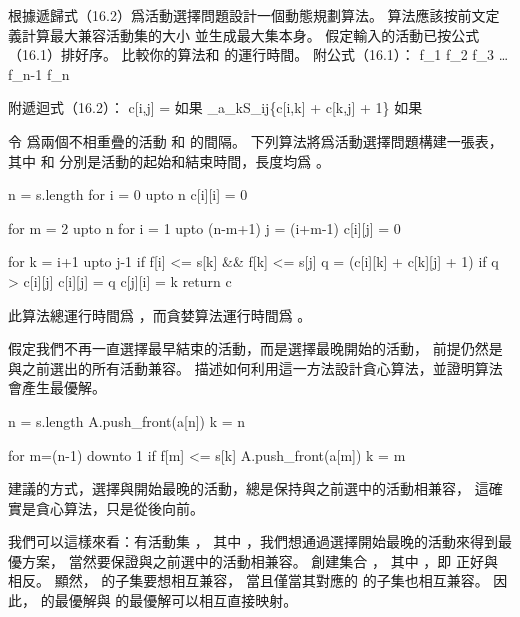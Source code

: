 \startsection[
  title={An activity-selection problem},
]

\startEXERCISE
根據遞歸式（16.2）爲活動選擇問題設計一個動態規劃算法。
算法應該按前文定義計算最大兼容活動集的大小  並生成最大集本身。
假定輸入的活動已按公式（16.1）排好序。
比較你的算法和  的運行時間。
附公式（16.1）：
\startformula
f_1 \le f_2 \le f_3 \le \ldots \le f_{n-1} \le f_n
\stopformula

附遞迴式（16.2）：
\startformula
c[i,j] = \startcases
{} \NC 如果  \NR
\NC \max_{a_k\in S_{ij}}\{c[i,k] + c[k,j] + 1\} \NC 如果  \NR
\stopcases\stopformula
\stopEXERCISE

\startANSWER
令  爲兩個不相重疊的活動  和  的間隔。
下列算法將爲活動選擇問題構建一張表，
其中  和  分別是活動的起始和結束時間，長度均爲 。

\startCLRS
n = s.length
for i = 0 upto n
	c[i][i] = 0

for m = 2 upto n
	for i = 1 upto (n-m+1)
		j = (i+m-1)
		c[i][j] = 0

		for k = i+1 upto j-1
			if f[i] <= s[k] && f[k] <= s[j]
				q = (c[i][k] + c[k][j] + 1)
				if q > c[i][j]
					c[i][j] = q
					c[j][i] = k
return c
\stopCLRS

此算法總運行時間爲 ，而貪婪算法運行時間爲 。
\stopANSWER

\startEXERCISE
假定我們不再一直選擇最早結束的活動，而是選擇最晚開始的活動，
前提仍然是與之前選出的所有活動兼容。
描述如何利用這一方法設計貪心算法，並證明算法會產生最優解。
\stopEXERCISE

\startANSWER
{}
\startCLRS
n = s.length
A.push_front(a[n])
k = n

for m=(n-1) downto 1
	if f[m] <= s[k]
		A.push_front(a[m])
		k = m
\stopCLRS

建議的方式，選擇與開始最晚的活動，總是保持與之前選中的活動相兼容，
這確實是貪心算法，只是從後向前。

我們可以這樣來看：有活動集 ，
其中 \m{a_i=[s_i,f_i)}，我們想通過選擇開始最晚的活動來得到最優方案，
當然要保證與之前選中的活動相兼容。
創建集合 ，
其中 \m{a'_i=[f_i,s_i)}，即  正好與  相反。
顯然， 的子集要想相互兼容，
當且僅當其對應的  的子集也相互兼容。
因此，  的最優解與  的最優解可以相互直接映射。
\stopANSWER

